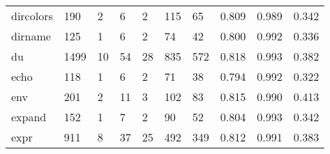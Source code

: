 \begin{longtable}{lp{2.0cm}p{2.0cm}p{2.0cm}p{2.0cm}p{2.0cm}p{2.0cm}p{2.0cm}p{2.0cm}p{2.0cm}}
dircolors &                    190 &                                  2 &                                 6 &                                2 &                               115 &                              65 &                                   0.809 &                                  0.989 &                                0.342 \\
dirname   &                    125 &                                  1 &                                 6 &                                2 &                                74 &                              42 &                                   0.800 &                                  0.992 &                                0.336 \\
du        &                   1499 &                                 10 &                                54 &                               28 &                               835 &                             572 &                                   0.818 &                                  0.993 &                                0.382 \\
echo      &                    118 &                                  1 &                                 6 &                                2 &                                71 &                              38 &                                   0.794 &                                  0.992 &                                0.322 \\
env       &                    201 &                                  2 &                                11 &                                3 &                               102 &                              83 &                                   0.815 &                                  0.990 &                                0.413 \\
expand    &                    152 &                                  1 &                                 7 &                                2 &                                90 &                              52 &                                   0.804 &                                  0.993 &                                0.342 \\
expr      &                    911 &                                  8 &                                37 &                               25 &                               492 &                             349 &                                   0.812 &                                  0.991 &                                0.383 \\

\end{longtable}
